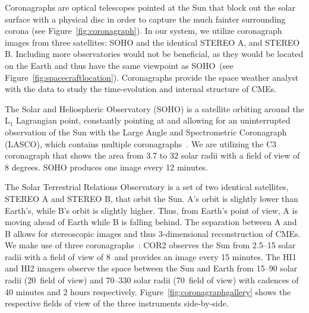 \documentclass[journal]{vgtc}                %
\begin{document}
Coronagraphs are optical telescopes pointed at the Sun that block out the solar surface with a physical disc in order to capture the much fainter surrounding corona (see Figure~\ref{fig:coronagraph}). In our system, we utilize coronagraph images from three satellites: SOHO and the identical STEREO A, and STEREO B. Including more observatories would not be beneficial, as they would be located on the Earth and thus have the same viewpoint as SOHO~(see Figure~\ref{fig:spacecraftlocation}). Coronagraphs provide the space weather analyst with the data to study the time-evolution and internal structure of CMEs.

 The Solar and Heliospheric Observatory (SOHO) is a satellite orbiting around the L$_1$ Lagrangian point, constantly pointing at and allowing for an uninterrupted observation of the Sun with the Large Angle and Spectrometric Coronagraph (LASCO), which contains multiple coronagraphs~\cite{Brueckner:1995cb}. We are utilizing the C3 coronagraph that shows the area from 3.7 to 32 solar radii with a field of view of 8 degrees. SOHO produces one image every 12 minutes. 


 The Solar Terrestrial Relations Observatory is a set of two identical satellites, STEREO A and STEREO B, that orbit the Sun. A's orbit is slightly lower than Earth's, while B's orbit is slightly higher. Thus, from Earth's point of view, A is moving ahead of Earth while B is falling behind. The separation between A and B allows for stereoscopic images and thus 3-dimensional reconstruction of CMEs. We make use of three coronagraphs~\cite{Socker:2000ic}: COR2 observes the Sun from 2.5--15 solar radii with a field of view of 8\degree\ and provides an image every 15 minutes. The HI1 and HI2 imagers observe the space between the Sun and Earth from 15--90 solar radii (20\degree\ field of view) and 70--330 solar radii (70\degree\ field of view) with cadences of 40 minutes and 2 hours respectively. Figure~\ref{fig:coronagraphgallery} shows the respective fields of view of the three instruments side-by-side.
\end{document}
